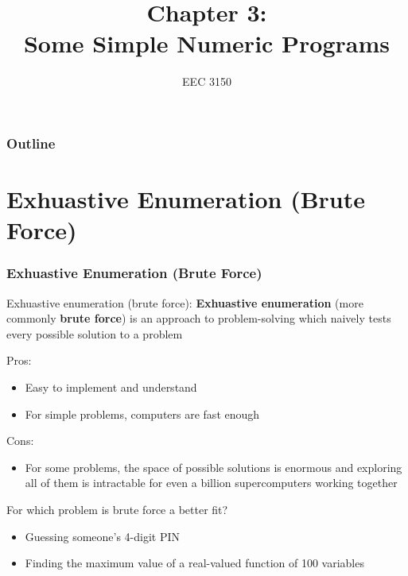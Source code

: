 \documentclass{beamer}
\title{Chapter 3: \\ Some Simple Numeric Programs}
\author{EEC 3150}
\date{}
\institute{Trevecca Nazarene University}
\begin{document}
\frame{\titlepage}
 
\begin{frame}	
	\frametitle{Outline}
	\tableofcontents	
\end{frame}


\section{Exhuastive Enumeration (Brute Force)}

\begin{frame}	
\end{frame}

\begin{frame}	
	\frametitle{Exhuastive Enumeration (Brute Force)}
	
	\begin{alertblock}{Exhuastive enumeration (brute force):}
		\textbf{Exhuastive enumeration} (more commonly \textbf{brute force}) is an approach to problem-solving which naively tests every possible solution to a problem
		
		\vspace{5pt}
		
		Pros:
		\begin{itemize}
			\item Easy to implement and understand
			\item For simple problems, computers are fast enough
		\end{itemize}
		
		\vspace{5pt}
		
		Cons:
		\begin{itemize}
			\item For some problems, the space of possible solutions is enormous and exploring all of them is intractable for even a billion supercomputers working together
		\end{itemize}
		
		\vspace{5pt}
		
		For which problem is brute force a better fit?
		\begin{itemize}
			\item Guessing someone's 4-digit PIN
			\item Finding the maximum value of a real-valued function of 100 variables
		\end{itemize}
	\end{alertblock}
	
\end{frame}
\end{document}
